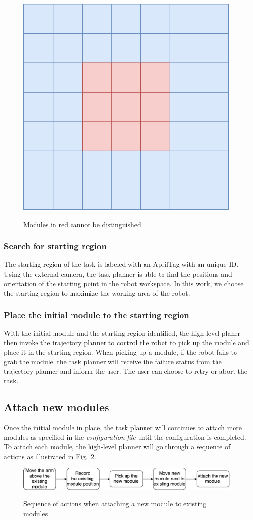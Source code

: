 \begin{figure}[ht!]%
\centering
{\includegraphics[width=0.3\columnwidth]{pics/moduleloop2.pdf}}
\caption{Modules in red cannot be distinguished}
\label{fig:loop2}
\end{figure}

\subsubsection{Search for starting region}
The starting region of the task is labeled with an AprilTag with an unique ID. Using the external camera, the task planner is able to find the positions and orientation of the starting point in the robot workspace. In this work, we choose the starting region to maximize the working area of the robot.

\subsubsection{Place the initial module to the starting region}
With the initial module and the starting region identified, the high-level planer then invoke the trajectory planner to control the robot to pick up the module and place it in the starting region.
When picking up a module, if the robot fails to grab the module, the task planner will receive the failure status from the trajectory planner and inform the user. The user can choose to retry or abort the task.

\subsection{Attach new modules}
Once the initial module in place, the task planner will continues to attach more modules as specified in the {\it configuration file} until the configuration is completed. To attach each module, the high-level planner will go through a sequence of actions as illustrated in Fig.~\ref{fig:attach}.

\begin{figure}[ht!]%
\centering
{\includegraphics[width=0.95\columnwidth]{pics/attach.pdf}}
\caption{Sequence of actions when attaching a new module to existing modules}
\label{fig:attach}
\end{figure}


